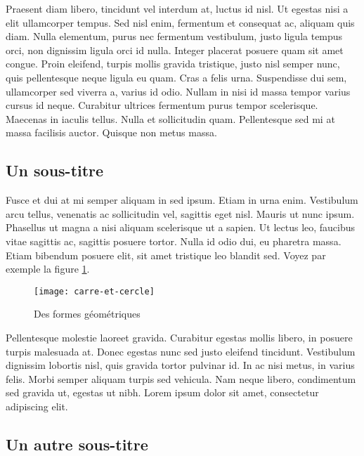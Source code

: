 Praesent diam libero, tincidunt vel interdum at, luctus id nisl. Ut egestas
nisi a elit ullamcorper tempus. Sed nisl enim, fermentum et consequat ac,
aliquam quis diam. Nulla elementum, purus nec fermentum vestibulum, justo
ligula tempus orci, non dignissim ligula orci id nulla. Integer placerat
posuere quam sit amet congue. Proin eleifend, turpis mollis gravida
tristique, justo nisl semper nunc, quis pellentesque neque ligula eu quam.
Cras a felis urna. Suspendisse dui sem, ullamcorper sed viverra a, varius id
odio. Nullam in nisi id massa tempor varius cursus id neque. Curabitur
ultrices fermentum purus tempor scelerisque. Maecenas in iaculis tellus.
Nulla et sollicitudin quam. Pellentesque sed mi at massa facilisis auctor.
Quisque non metus massa.

\subsection{Un sous-titre}

Fusce et dui at mi semper aliquam in sed ipsum. Etiam in urna enim.
Vestibulum arcu tellus, venenatis ac sollicitudin vel, sagittis eget nisl.
Mauris ut nunc ipsum. Phasellus ut magna a nisi aliquam scelerisque ut a
sapien. Ut lectus leo, faucibus vitae sagittis ac, sagittis posuere tortor.
Nulla id odio dui, eu pharetra massa. Etiam bibendum posuere elit, sit amet
tristique leo blandit sed. Voyez par exemple la figure \ref{fig:formes}.

\begin{figure}
  \begin{center}
  \texttt{[image: carre-et-cercle]}
  \end{center}
  \caption{Des formes géométriques}
  \label{fig:formes}
\end{figure}

Pellentesque molestie laoreet gravida. Curabitur egestas mollis libero, in
posuere turpis malesuada at. Donec egestas nunc sed justo eleifend
tincidunt. Vestibulum dignissim lobortis nisl, quis gravida tortor pulvinar
id. In ac nisi metus, in varius felis. Morbi semper aliquam turpis sed
vehicula. Nam neque libero, condimentum sed gravida ut, egestas ut nibh.
Lorem ipsum dolor sit amet, consectetur adipiscing elit.

\subsection{Un autre sous-titre}

